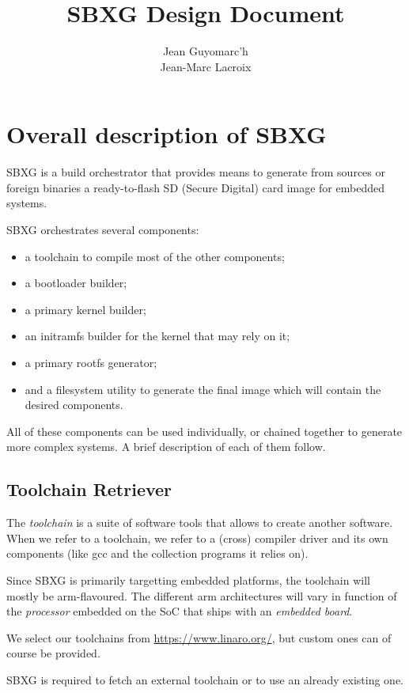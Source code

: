 \documentclass{article}
\title{SBXG Design Document}
\date{}
\author{%
  Jean Guyomarc'h%
  \\Jean-Marc Lacroix%
}
\begin{document}
\maketitle

\section{Overall description of SBXG}

SBXG is a build orchestrator that provides means to generate from sources or
foreign binaries a ready-to-flash SD (Secure Digital) card image for embedded systems.

SBXG orchestrates several components:
\begin{itemize}
\item a toolchain to compile most of the other components;
\item a bootloader builder;
\item a primary kernel builder;
\item an initramfs builder for the kernel that may rely on it;
\item a primary rootfs generator;
\item and a filesystem utility to generate the final image which will contain the
  desired components.
\end{itemize}

All of these components can be used individually, or chained together to
generate more complex systems. A brief description of each of them follow.

\subsection{Toolchain Retriever}

The \emph{toolchain} is a suite of software tools that allows to create another
software. When we refer to a toolchain, we refer to a (cross) compiler driver
and its own components (like gcc and the collection programs it relies on).

Since SBXG is primarily targetting embedded platforms, the toolchain will mostly
be arm-flavoured. The different arm architectures will vary in function of the
\emph{processor} embedded on the SoC that ships with an \emph{embedded board}.

We select our toolchains from \url{https://www.linaro.org/}, but custom ones can
of course be provided.

\begin{requirement}
  SBXG is required to fetch an external toolchain or to use an already existing
  one.
\end{requirement} 
\end{document}
